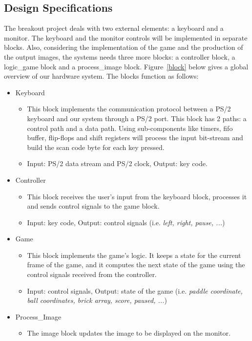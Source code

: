 \documentclass[conference]{IEEEtran}
\begin{document}
\subsection{Design Specifications}
		
The breakout project deals with two external elements: a keyboard and a monitor. The keyboard and the monitor controls will be implemented in separate blocks. Also, considering the implementation of the game and the production of the output images, the systems needs three more blocks: a controller block, a logic\_game block and a process\_image block. Figure~\ref{block} below gives a global overview of our hardware system. The blocks function as follows:
\begin{itemize}
\item Keyboard
\begin{itemize}
\item This block implements the communication protocol between a PS/2 keyboard and our system through a PS/2 port. This block has 2 paths: a control path and a data path. Using sub-components like timers, fifo buffer, flip-flops and shift registers will process the input bit-stream and build the scan code byte for each key pressed.
\item Input: PS/2 data stream and PS/2 clock, Output: key code.
\end{itemize}
\item Controller
\begin{itemize}
\item This block receives the user’s input from the keyboard block, processes it and sends control signals to the game block.
\item Input: key code, Output: control signals (i.e. \emph{left, right, pause, ...})
\end{itemize}
\item Game
\begin{itemize}
\item This block implements the game’s logic. It keeps a state for the current frame of the game, and it computes the next state of the game using the control signals received from the controller.
\item Input: control signals, Output: state of the game (i.e. \emph{paddle coordinate, ball coordinates, brick array, score, paused, ...})
\end{itemize}
\item Process\_Image
\begin{itemize}
\item The image block updates the image to be displayed on the monitor.

\end{itemize}
\end{itemize}
\end{document}
